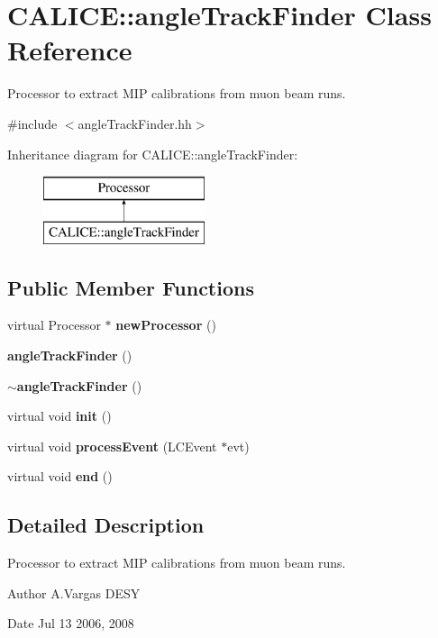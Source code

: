 \section{C\-A\-L\-I\-C\-E\-:\-:angle\-Track\-Finder Class Reference}
\label{classCALICE_1_1angleTrackFinder}


Processor to extract M\-I\-P calibrations from muon beam runs.  




{\ttfamily \#include $<$angle\-Track\-Finder.\-hh$>$}

Inheritance diagram for C\-A\-L\-I\-C\-E\-:\-:angle\-Track\-Finder\-:\begin{figure}[H]
\begin{center}
\leavevmode
\includegraphics[height=2.000000cm]{classCALICE_1_1angleTrackFinder}
\end{center}
\end{figure}
\subsection*{Public Member Functions}
\begin{DoxyCompactItemize}
\item 
virtual Processor $\ast$ {\bf new\-Processor} ()
\item 
{\bf angle\-Track\-Finder} ()
\item 
{\bf $\sim$angle\-Track\-Finder} ()
\item 
virtual void {\bf init} ()
\item 
virtual void {\bf process\-Event} (L\-C\-Event $\ast$evt)
\item 
virtual void {\bf end} ()
\end{DoxyCompactItemize}


\subsection{Detailed Description}
Processor to extract M\-I\-P calibrations from muon beam runs. 

\begin{DoxyAuthor}{Author}
A.\-Vargas D\-E\-S\-Y 
\end{DoxyAuthor}
\begin{DoxyDate}{Date}
Jul 13 2006, 2008 
\end{DoxyDate}


